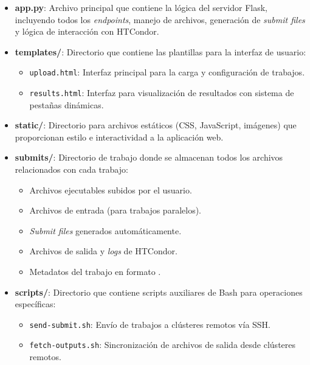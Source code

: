 \begin{itemize}
	\item \textbf{app.py}: Archivo principal que contiene la lógica del servidor Flask, incluyendo todos los \textit{endpoints}, manejo de archivos, generación de \textit{submit files} y lógica de interacción con HTCondor.

	\item \textbf{templates/}: Directorio que contiene las plantillas \HTML para la interfaz de usuario:
	      \begin{itemize}
		      \item \texttt{upload.html}: Interfaz principal para la carga y configuración de trabajos.
		      \item \texttt{results.html}: Interfaz para visualización de resultados con sistema de pestañas dinámicas.
	      \end{itemize}

	\item \textbf{static/}: Directorio para archivos estáticos (CSS, JavaScript, imágenes) que proporcionan estilo e interactividad a la aplicación web.

	\item \textbf{submits/}: Directorio de trabajo donde se almacenan todos los archivos relacionados con cada trabajo:
	      \begin{itemize}
		      \item Archivos ejecutables subidos por el usuario.
		      \item Archivos de entrada (para trabajos paralelos).
		      \item \textit{Submit files} generados automáticamente.
		      \item Archivos de salida y \textit{logs} de HTCondor.
		      \item Metadatos del trabajo en formato \JSON.
	      \end{itemize}

	\item \textbf{scripts/}: Directorio que contiene scripts auxiliares de Bash para operaciones específicas:
	      \begin{itemize}
		      \item \texttt{send-submit.sh}: Envío de trabajos a clústeres remotos vía SSH.
		      \item \texttt{fetch-outputs.sh}: Sincronización de archivos de salida desde clústeres remotos.
	      \end{itemize}
\end{itemize}

